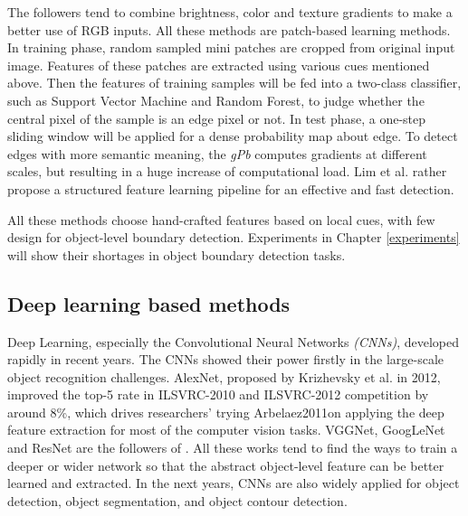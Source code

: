 \documentclass[senior]{IPSstyle}
\begin{document}
The followers \cite{Malik2001, Arbelaez2011, Krahenbuhl2015} tend to combine brightness, color and texture gradients to make a better use of RGB inputs. All these methods are patch-based learning methods. In training phase, random sampled mini patches are cropped from original input image. Features of these patches are extracted using various cues mentioned above. Then the features of training samples will be fed into a two-class classifier, such as Support Vector Machine and Random Forest, to judge whether the central pixel of the sample is an edge pixel or not. In test phase, a one-step sliding window will be applied for a dense probability map about edge. To detect edges with more semantic meaning, the \emph{gPb}\cite{Arbelaez2011} computes gradients at different scales, but resulting in a huge increase of computational load. Lim et al.\cite{Dollar2013} rather propose a structured feature learning pipeline for an effective and fast detection.

 All these methods choose hand-crafted features based on local cues, with few design for object-level boundary detection. Experiments in Chapter \ref{experiments} will show their shortages in object boundary detection tasks.

\subsection{Deep learning based methods}

Deep Learning, especially the Convolutional Neural Networks \emph{(CNNs)}, developed rapidly in recent years. The CNNs showed their power firstly in the large-scale object recognition challenges. AlexNet, proposed by Krizhevsky et al.\cite{Krizhevsky2012} in 2012, improved the top-5 rate in ILSVRC-2010 and ILSVRC-2012 competition by around 8\%, which drives researchers' trying {Arbelaez2011}on applying the deep feature extraction for most of the computer vision tasks. VGGNet\cite{Simonyan2014}, GoogLeNet\cite{Szegedy2015} and ResNet\cite{He2016} are the followers of \cite{Krizhevsky2012}. All these works tend to find the ways to train a deeper or wider network so that the abstract object-level feature can be better learned and extracted. In the next years, CNNs are also widely applied for object detection\cite{Girshick2014, Girshick2015, Ren2015}, object segmentation\cite{Pinheiro2015}, and object contour detection\cite{Shen2015, Kivinen2014, Ganin2014}.
\end{document}
